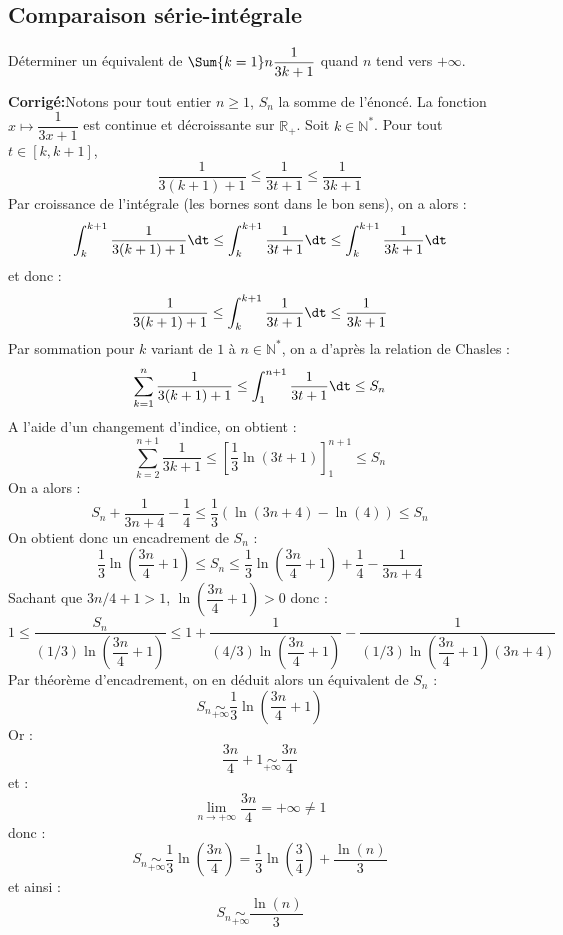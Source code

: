 \documentclass[a4paper,twoside,french,10pt]{VcCours}
\newcommand{\corr}{\textbf{Corrigé:}}
\begin{document}
\medskip

\subsection{Comparaison série-intégrale}

\medskip

\begin{Exercice}{} Déterminer un équivalent de $\Sum{k=1}n \dfrac{1}{3k+1}$ quand $n$ tend vers $+ \infty$.
\end{Exercice}

\corr Notons pour tout entier $n \geq 1$, $S_n$ la somme de l'énoncé. La fonction $x \mapsto \dfrac{1}{3x+1}$ est continue et décroissante sur $\mathbb{R}_+$. Soit $k \in \mathbb{N}^*$. Pour tout $t \in [k,k+1]$,
$$ \dfrac{1}{3(k+1)+1} \leq \dfrac{1}{3t+1} \leq \dfrac{1}{3k+1}$$
Par croissance de l'intégrale (les bornes sont dans le bon sens), on a alors :
$$ \int_{k}^{k+1} \dfrac{1}{3(k+1)+1} \dt \leq  \int_{k}^{k+1} \dfrac{1}{3t+1} \dt \leq  \int_{k}^{k+1} \dfrac{1}{3k+1} \dt$$
et donc :
$$  \dfrac{1}{3(k+1)+1}  \leq  \int_{k}^{k+1} \dfrac{1}{3t+1} \dt  \leq  \dfrac{1}{3k+1} $$
Par sommation pour $k$ variant de $1$ à $n \in \mathbb{N}^*$, on a d'après la relation de Chasles :
$$ \sum_{k=1}^n \dfrac{1}{3(k+1)+1}  \leq  \int_{1}^{n+1} \dfrac{1}{3t+1} \dt  \leq S_n $$
A l'aide d'un changement d'indice, on obtient :
$$ \sum_{k=2}^{n+1} \dfrac{1}{3k+1}  \leq  \left[ \dfrac{1}{3} \ln(3t+1) \right]_1^{n+1}  \leq S_n $$
On a alors :
$$ S_n + \dfrac{1}{3n+4} - \dfrac{1}{4} \leq \dfrac{1}{3} ( \ln(3n+4)- \ln(4)) \leq S_n $$
On obtient donc un encadrement de $S_n$ :
$$ \dfrac{1}{3} \ln \left( \dfrac{3n}{4} + 1 \right) \leq S_n \leq \dfrac{1}{3} \ln \left( \dfrac{3n}{4} + 1 \right) + \dfrac{1}{4} - \dfrac{1}{3n+4}$$
Sachant que $3n/4+1>1$, $\ln \left( \dfrac{3n}{4} + 1 \right)>0$ donc :
$$ 1 \leq \dfrac{S_n}{(1/3)\ln \left( \dfrac{3n}{4} + 1 \right)} \leq 1 + \dfrac{1}{(4/3)\ln \left( \dfrac{3n}{4} + 1 \right)} - \dfrac{1}{(1/3)\ln \left( \dfrac{3n}{4} + 1 \right)(3n+4)}$$
Par théorème d'encadrement, on en déduit alors un équivalent de $S_n$ :
$$ S_n \underset{+ \infty}{\sim}\dfrac{1}{3} \ln \left( \dfrac{3n}{4} + 1 \right)$$
Or :
$$  \dfrac{3n}{4} + 1 \underset{+ \infty}{\sim}  \dfrac{3n}{4}$$
et :
$$ \lim_{n \rightarrow + \infty}  \dfrac{3n}{4} = + \infty \neq 1$$
donc :
$$ S_n \underset{+ \infty}{\sim} \dfrac{1}{3} \ln \left( \dfrac{3n}{4} \right) =  \dfrac{1}{3} \ln \left( \dfrac{3}{4} \right) + \dfrac{\ln(n)}{3}$$
et ainsi :
$$ S_n \underset{+ \infty}{\sim}\dfrac{\ln(n)}{3}$$
\end{document}
